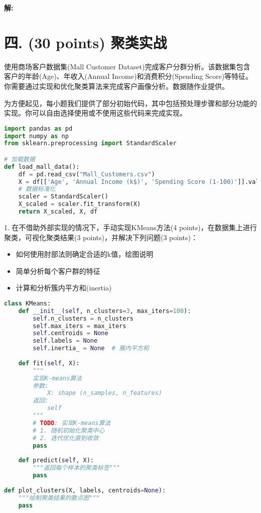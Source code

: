\documentclass[8pt]{article}
\begin{document}
\textbf{\large 解:}

\vspace{3em}

\section*{四. (30 points) 聚类实战}
使用商场客户数据集(Mall Customer Dataset)完成客户分群分析。该数据集包含客户的年龄(Age)、年收入(Annual Income)和消费积分(Spending Score)等特征。你需要通过实现和优化聚类算法来完成客户画像分析。数据随作业提供。

为方便起见，每小题我们提供了部分初始代码，其中包括预处理步骤和部分功能的实现。你可以自由选择使用或不使用这些代码来完成实现。
\begin{lstlisting}[language=Python, caption=数据加载]
import pandas as pd
import numpy as np
from sklearn.preprocessing import StandardScaler

# 加载数据
def load_mall_data():
    df = pd.read_csv("Mall_Customers.csv")
    X = df[['Age', 'Annual Income (k$)', 'Spending Score (1-100)']].values
    # 数据标准化
    scaler = StandardScaler()
    X_scaled = scaler.fit_transform(X)
    return X_scaled, X, df
\end{lstlisting}
1. 在不借助外部实现的情况下，手动实现KMeans方法(4 points)，在数据集上进行聚类，可视化聚类结果(3 points)，并解决下列问题(3 points)：
\begin{itemize}
    \item 如何使用肘部法则确定合适的k值，绘图说明
    \item 简单分析每个客户群的特征
    \item 计算和分析簇内平方和(inertia)
\end{itemize}

\begin{lstlisting}[language=Python, caption=Kmeans部分实现]
class KMeans:
    def __init__(self, n_clusters=3, max_iters=100):
        self.n_clusters = n_clusters
        self.max_iters = max_iters
        self.centroids = None
        self.labels = None
        self.inertia_ = None  # 簇内平方和
        
    def fit(self, X):
        """
        实现K-means算法
        参数:
            X: shape (n_samples, n_features)
        返回:
            self
        """
        # TODO: 实现K-means算法
        # 1. 随机初始化聚类中心
        # 2. 迭代优化直到收敛
        pass
    
    def predict(self, X):
        """返回每个样本的聚类标签"""
        pass
        
def plot_clusters(X, labels, centroids=None):
    """绘制聚类结果的散点图"""
    pass
\end{lstlisting}
\end{document}
